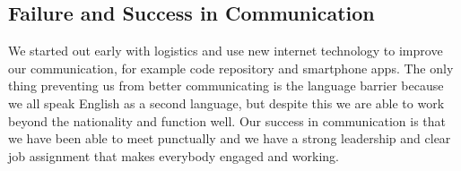 \documentclass[a4paper]{article}
\begin{document}
\subsection*{Failure and Success in Communication}
We started out early with logistics and use new internet technology to improve our communication, for example
code repository and smartphone apps. The only thing preventing us from better communicating is the language barrier
because we all speak English as a second language, but despite this we are able to work beyond the nationality and
function well. Our success in communication is that we have been able to meet punctually and we have a strong
leadership and clear job assignment that makes everybody engaged and working.
\end{document}
